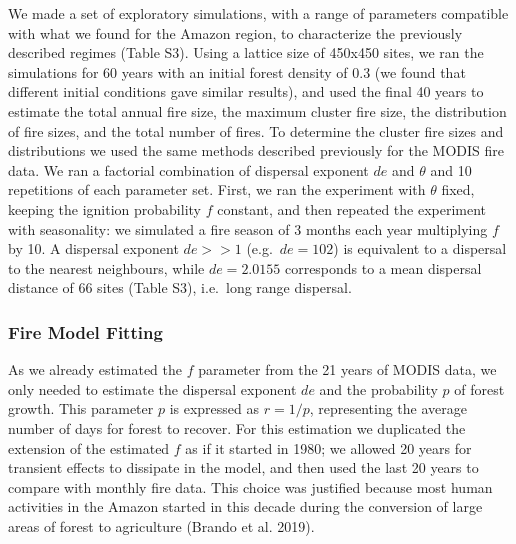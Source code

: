 \documentclass[
]{article}
\begin{document}
We made a set of exploratory simulations, with a range of parameters
compatible with what we found for the Amazon region, to characterize the
previously described regimes (Table S3). Using a lattice size of 450x450
sites, we ran the simulations for 60 years with an initial forest
density of 0.3 (we found that different initial conditions gave similar
results), and used the final 40 years to estimate the total annual fire
size, the maximum cluster fire size, the distribution of fire sizes, and
the total number of fires. To determine the cluster fire sizes and
distributions we used the same methods described previously for the
MODIS fire data. We ran a factorial combination of dispersal exponent
\(de\) and \(\theta\) and 10 repetitions of each parameter set. First,
we ran the experiment with \(\theta\) fixed, keeping the ignition
probability \(f\) constant, and then repeated the experiment with
seasonality: we simulated a fire season of 3 months each year
multiplying \(f\) by 10. A dispersal exponent \(de>>1\)
(e.g.~\(de=102\)) is equivalent to a dispersal to the nearest
neighbours, while \(de=2.0155\) corresponds to a mean dispersal distance
of 66 sites (Table S3), i.e.~long range dispersal.

\subsubsection{Fire Model Fitting}\label{fire-model-fitting}

As we already estimated the \(f\) parameter from the 21 years of MODIS
data, we only needed to estimate the dispersal exponent \(de\) and the
probability \(p\) of forest growth. This parameter \(p\) is expressed as
\(r=1/p\), representing the average number of days for forest to
recover. For this estimation we duplicated the extension of the
estimated \(f\) as if it started in 1980; we allowed 20 years for
transient effects to dissipate in the model, and then used the last 20
years to compare with monthly fire data. This choice was justified
because most human activities in the Amazon started in this decade
during the conversion of large areas of forest to agriculture (Brando et
al. 2019).
\end{document}
